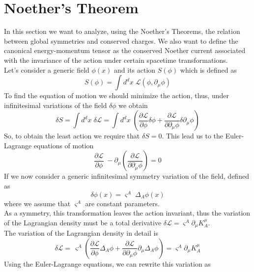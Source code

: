 \documentclass[a4paper,10pt]{article}
\begin{document}
\section*{Noether's Theorem}
In this section we want to analyze, using the Noether's Theorems, the relation between global symmetries and conserved charges. We also want to define the canonical energy-momentum tensor as the conserved Noether current associated with the invariance of the action under certain spacetime transformations.\\
Let's consider a generic field $\phi(x)$ and its action $ S(\phi)$ which is defined as
\begin{equation}
 S(\phi)=\int { d^dx\; \mathcal{L} \left( \phi, \partial_\mu \phi \right)}
\end{equation}
To find the equation of motion we should minimize the action, thus, under infinitesimal variations of the field $\delta \phi$ we obtain
\begin{equation}
 \delta S = \int{ d^dx\;\delta \mathcal{L}}= \int{ d^dx\;( \frac{\partial \mathcal{L}}{\partial \phi} \delta \phi + \frac{\partial \mathcal{L}}{\partial \partial_\mu \phi} \delta \partial_\mu \phi)}
\end{equation}
So, to obtain the least action we require that $\delta S =0$. This lead us to the Euler-Lagrange equations of motion
\begin{equation}
 \frac{\partial \mathcal{L}}{\partial \phi}\;-\partial_\mu \left(\frac{\partial \mathcal{L}}{\partial \partial_\mu \phi}\right)=0
\end{equation}
If we now consider a generic infinitesimal symmetry variation of the field, defined as
\begin{equation}
 \delta \phi(x)= \varsigma^A \; \Delta_A \phi(x)
\end{equation}
where we assume that $\varsigma^A$ are constant parameters.\\
As a symmetry, this transformation leaves the action invariant, thus the variation of the Lagrangian density must be a total derivative $ \delta \mathcal{L}= \varsigma^A \partial_\mu K^\mu_A$.\\
The variation of the Lagrangian density in detail is
\begin{equation}
 \delta \mathcal{L}= \, \varsigma^A \left(\frac{\partial \mathcal{L}}{\partial \phi}\Delta_A\phi +\frac{\partial \mathcal{L}}{\partial \partial_\mu \phi}\partial_\mu \Delta_A \phi \right)= \varsigma^A \partial_\mu K^\mu_A
\end{equation}
Using the Euler-Lagrange equations, we can rewrite this variation as
\end{document}
